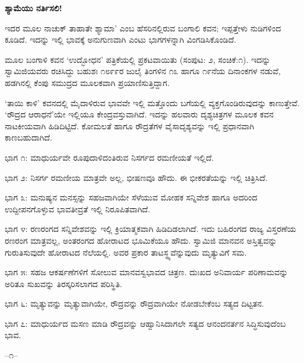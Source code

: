 
\begin{center}
\textbf{ಶ್ಯಾಮೆಯು ನರ್ತಿಸಲಿ!}
\end{center}

ಇದರ ಮೂಲ ನಾಚುಕ್ ತಾಹಾತೇ ಶ್ಯಾಮಾ' ಎಂಬ ಹೆಸರಿನಲ್ಲಿರುವ ಬಂಗಾಲಿ ಕವನ; ಇಪ್ಪತ್ತೇಳು ನುಡಿಗಳಿಂದ ಕೂಡಿದೆ. ಇದನ್ನು ಇಲ್ಲಿ ಭಾವಕ್ಕೆ ಅನುಗುಣವಾಗಿ ಎಂಟು ಭಾಗಗಳನ್ನಾಗಿ ವಿಂಗಡಿಸಿಕೊಂಡಿದೆ.

ಮೂಲ ಬಂಗಾಳಿ ಕವನ ‘ಉದ್ಭೋಧನ’ ಪತ್ರಿಕೆಯಲ್ಲಿ ಪ್ರಕಟವಾಯಿತು (ಸಂಪುಟ: ೨, ಸಂಚಿಕೆ:೧). ಇದನ್ನು ಸ್ವಾಮಿಜಿಯವರು ರಚಿಸಿದ್ದು ಬಹುಶಃ ೧೮೯೯ರ ಜುಲೈ ತಿಂಗಳಿನ ೧೩ ಹಾಗೂ ೧೯ನೆಯ ದಿನಾಂಕಗಳ ನಡುವೆ, ಹಡಗಿನಲ್ಲಿ ಕೆಂಪು ಸಮುದ್ರದ ಮೂಲಕವಾಗಿ ಪ್ರಯಾಣಿಸುತ್ತಿದ್ದಾಗ.

‘ತಾಯಿ ಕಾಳಿ’ ಕವನದಲ್ಲಿ ಮೈದಾಳಿರುವ ಭಾವವೇ ಇಲ್ಲಿ ಮತ್ತೊಂದು ಬಗೆಯಲ್ಲಿ ವ್ಯಕ್ತಗೊಂಡಿರುವುದನ್ನು ಕಾಣುತ್ತೇವೆ. ‘ರೌದ್ರದ ಆರಾಧನೆ’ಯೇ ಇಲ್ಲಿಯೂ ಕೇಂದ್ರವಸ್ತುವಾಗಿದೆ. ಇದನ್ನು ಹಲವಾರು ದೃಶ್ಯಚಿತ್ರಗಳ ಮೂಲಕ ಕವನ ನಾಟಕೀಯವಾಗಿ ಹಿಡಿದಿಟ್ಟಿದೆ. ಕೋಮಲತೆ ಹಾಗೂ ರೌದ್ರತೆಗಳ ವೈಸಾದೃಶ್ಯವನ್ನು ಇಲ್ಲಿ ಪ್ರಧಾನವಾಗಿ ಕಾಣಬಹುದಾಗಿದೆ.

ಭಾಗ ೧: ಮಾಧುರ್ಯವೇ ರೂಪುದಾಳಿದಂತಿರುವ ನಿಸರ್ಗದ ರಮಣೀಯತೆ ಇಲ್ಲಿದೆ.

ಭಾಗ ೨: ನಿಸರ್ಗ ರಮಣೀಯ ಮಾತ್ರವೇ ಅಲ್ಲ, ಭೀಷಣವೂ ಹೌದು. ಈ ಭೀಕರತೆಯನ್ನು ಇಲ್ಲಿ ಚಿತ್ರಿಸಿದೆ.

ಭಾಗ ೩: ಮನುಷ್ಯನ ಮನಸ್ಸನ್ನು ಸಹಜವಾಗಿಯೇ ಸೆಳೆಯುವ ಮೋಹಕ ಸನ್ನಿವೇಶ ಹಾಗೂ ಅದರಿಂದ ಉದ್ದೀಪನಗೊಳ್ಳುವ ಭಾವತೀವ್ರತೆ ಇಲ್ಲಿ ನಿರೂಪಿತವಾಗಿದೆ.

ಭಾಗ ೪: ರಣರಂಗದ ಸನ್ನಿವೇಶವನ್ನು ಇಲ್ಲಿ ಕ್ರಿಯಾತ್ಮಕವಾಗಿ ಹಿಡಿದಿಡಲಾಗಿದೆ. ಇದು ಬಹಿರಂಗದ ರಾಜ್ಯ ವಿಸ್ತರಣೆಯ ರಣರಂಗ ಮಾತ್ರವಲ್ಲ, ಅಂತರಂಗದ ಹೋರಾಟದ ಭೂಮಿಕೆಯೂ ಹೌದು. ಸ್ವಾಮಿಜಿ ಮಾನವನ ಅಸ್ತಿತ್ವವನ್ನು ಗುರುತಿಸುವುದೇ ಹೋರಾಟದ ನೆಲೆಯಲ್ಲಿ. ಅವರ ಪ್ರಕಾರ ತಾಟಸ್ಥ್ಯವೆನ್ನುವುದು ಮೃತ್ಯುವಿಗೆ ಸಮ.

ಭಾಗ ೫: ಸಹಜ ಆಕರ್ಷಣೆಗಳಿಗೆ ಸೋಲುವ ಮಾನವಸ್ವಭಾವದ ಚಿತ್ರಣ. ದುಃಖದ ಅನಿವಾರ್ಯ ಪರಿಣಾಮವನ್ನು ಅರಿತೂ ಸುಖವನ್ನು ತಿರಸ್ಕರಿಸಲಾಗದ ಪರಿಸ್ಥಿತಿ.

ಭಾಗ ೬: ಮೃತ್ಯುವನ್ನು ಮೃತ್ಯುವಾಗಿಯೇ, ರೌದ್ರವನ್ನು ರೌದ್ರವಾಗಿಯೇ ನೋಡಬೇಕೆಂಬ ಸತ್ಯದ ದಿಟ್ಟತನ.

ಭಾಗ ೭: ಮಾಧುರ್ಯದ ಮಸಣ ಮಾಡಿ ರೌದ್ರವನ್ನು ಆಹ್ವಾನಿಸಿದಾಗಲೇ ಸತ್ಯದ ಆನಂದನರ್ತನ ಸಿದ್ಧಿಸುವುದೆಂಬ ಭಾವ.

\begin{center}
–೧–
\end{center}

